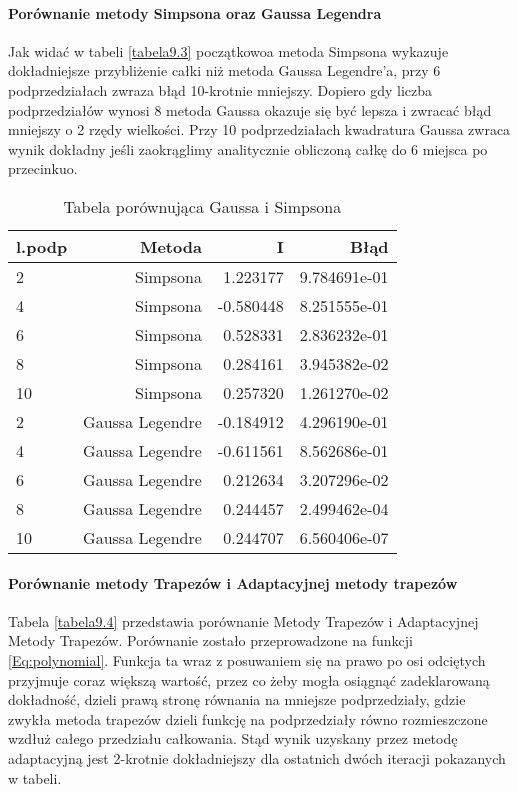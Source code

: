 \documentclass[12pt,twoside]{article}
\begin{document}
\paragraph{Porównanie metody Simpsona oraz Gaussa Legendra}\mbox{}

Jak widać w tabeli \eqref{tabela9.3} początkowoa metoda Simpsona wykazuje dokładniejsze przybliżenie całki niż metoda Gaussa Legendre'a, przy 6 podprzedziałach zwraza błąd 10-krotnie mniejszy. Dopiero gdy liczba podprzedziałów wynosi 8 metoda Gaussa okazuje się być lepsza i zwracać błąd mniejszy o 2 rzędy wielkości. 
Przy 10 podprzedziałach kwadratura Gaussa zwraca wynik dokładny jeśli zaokrąglimy analitycznie obliczoną całkę do 6 miejsca po przecinkuo.

\begin{table}[h]
\centering 
\caption{Tabela porównująca Gaussa i Simpsona }
\label{tabela9.3}
\begin{tabular}{lrrr}
\toprule
{l.podp} & Metoda &  I &  Błąd \\
\midrule
2  &     Simpsona & 1.223177 &   9.784691e-01 \\
4  &     Simpsona & -0.580448  &   8.251555e-01  \\
6  &     Simpsona &  0.528331  &   2.836232e-01  \\
8  &     Simpsona & 0.284161 &   3.945382e-02  \\
10 &     Simpsona & 0.257320 &   1.261270e-02  \\
\midrule
2  &     Gaussa Legendre & -0.184912 &  4.296190e-01   \\
4  &     Gaussa Legendre & -0.611561 &  8.562686e-01   \\
6  &     Gaussa Legendre & 0.212634 &  3.207296e-02   \\
8  &     Gaussa Legendre & 0.244457 &  2.499462e-04  \\
10 &     Gaussa Legendre & 0.244707 &  6.560406e-07  \\

\bottomrule
\end{tabular}
\end{table}




\paragraph{Porównanie metody Trapezów i Adaptacyjnej metody trapezów}\mbox{}

Tabela \eqref{tabela9.4} przedstawia porównanie Metody Trapezów i Adaptacyjnej Metody Trapezów. Porównanie zostało przeprowadzone na funkcji \eqref{Eq:polynomial}. Funkcja ta wraz z posuwaniem się na prawo po osi odciętych przyjmuje coraz większą wartość, przez co żeby mogła osiągnąć zadeklarowaną dokładność, dzieli prawą stronę równania na mniejsze podprzedziały, gdzie zwykła metoda trapezów dzieli funkcję na podprzedziały równo rozmieszczone wzdłuż całego przedziału całkowania. Stąd wynik uzyskany przez metodę adaptacyjną jest 2-krotnie dokładniejszy dla ostatnich dwóch iteracji pokazanych w tabeli.
\end{document}
